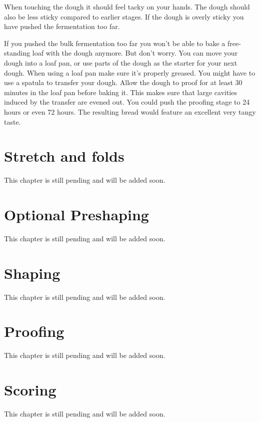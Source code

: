 When touching the dough it should feel tacky
on your hands. The dough should also be less sticky
compared to earlier stages. If the dough is overly
sticky you have pushed the fermentation too far.

If you pushed the bulk fermentation too far you won't be able
to bake a free-standing loaf with the dough anymore. But don't
worry. You can move your dough into a loaf pan, or use parts
of the dough as the starter for your next dough. When using
a loaf pan make sure it's properly greased. You might have
to use a spatula to transfer your dough. Allow the dough
to proof for at least 30 minutes in the loaf pan before
baking it. This makes sure that large cavities induced
by the transfer are evened out. You could push the proofing
stage to 24 hours or even 72 hours. The resulting
bread would feature an excellent very tangy taste.


\section{Stretch and folds}
This chapter is still pending and will be added soon.

\section{Optional Preshaping}
This chapter is still pending and will be added soon.

\section{Shaping}
This chapter is still pending and will be added soon.

\section{Proofing}
This chapter is still pending and will be added soon.

\section{Scoring}
This chapter is still pending and will be added soon.
